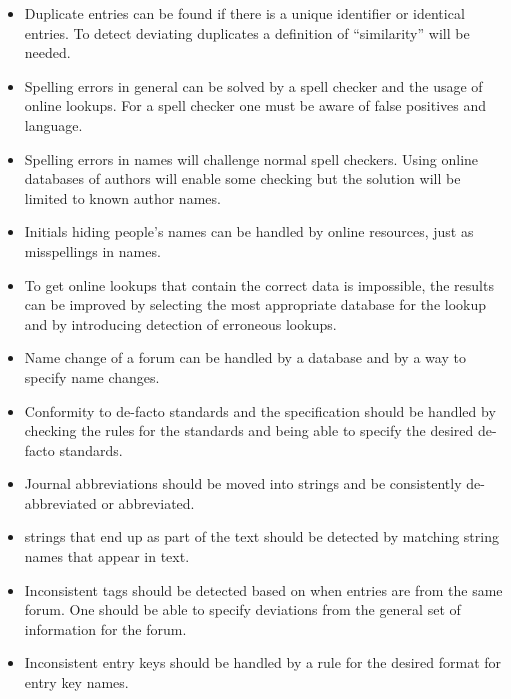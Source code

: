 \begin{itemize}
\item Duplicate entries can be found if there is a unique identifier
  or identical entries.  To detect deviating duplicates a definition
  of ``similarity'' will be needed.

\item Spelling errors in general can be solved by a spell checker and
  the usage of online lookups.  For a spell checker one must be aware
  of false positives and language.

\item Spelling errors in names will challenge normal spell checkers.
  Using online databases of authors will enable some checking but the
  solution will be limited to known author names.

\item Initials hiding people's names can be handled by online
  resources, just as misspellings in names.

\item To get online lookups that contain the correct data is
  impossible, the results can be improved by selecting the most
  appropriate database for the lookup and by introducing detection of
  erroneous lookups.

\item Name change of a forum can be handled by a database and by a way
  to specify name changes.

\item Conformity to de-facto standards and the {\bibtex} specification
  should be handled by checking the rules for the standards and being
  able to specify the desired de-facto standards.

\item Journal abbreviations should be moved into strings and be
  consistently de-abbreviated or abbreviated.

\item {\bibtex} strings that end up as part of the text should be
  detected by matching string names that appear in text.

\item Inconsistent tags should be detected based on when entries are
  from the same forum.  One should be able to specify deviations from
  the general set of information for the forum.

\item Inconsistent entry keys should be handled by a rule for the
  desired format for entry key names.
\end{itemize}


